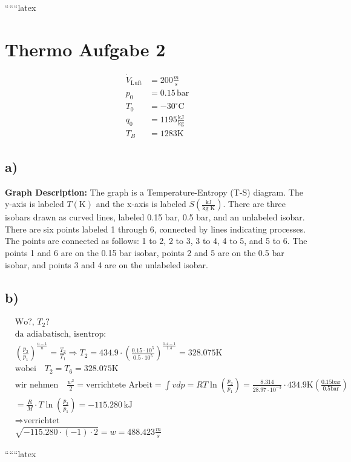 
``````latex


\section*{Thermo Aufgabe 2}

\begin{align*}
\dot{V}_{\text{Luft}} &= 200 \frac{m}{s} \\
p_0 &= 0.15 \, \text{bar} \\
T_0 &= -30^\circ \text{C} \\
q_0 &= 1195 \frac{\text{kJ}}{\text{kg}} \\
T_B &= 1283 \text{K}
\end{align*}

\subsection*{a)}

\textbf{Graph Description:} The graph is a Temperature-Entropy (T-S) diagram. The y-axis is labeled $T(\text{K})$ and the x-axis is labeled $S \left( \frac{\text{kJ}}{\text{kg K}} \right)$. There are three isobars drawn as curved lines, labeled 0.15 bar, 0.5 bar, and an unlabeled isobar. There are six points labeled 1 through 6, connected by lines indicating processes. The points are connected as follows: 1 to 2, 2 to 3, 3 to 4, 4 to 5, and 5 to 6. The points 1 and 6 are on the 0.15 bar isobar, points 2 and 5 are on the 0.5 bar isobar, and points 3 and 4 are on the unlabeled isobar.

\subsection*{b)}

\begin{align*}
&\text{Wo?}, \, T_2? \\
&\text{da adiabatisch, isentrop:} \\
&\left( \frac{p_2}{p_1} \right)^{\frac{n-1}{n}} = \frac{T_2}{T_1} \Rightarrow T_2 = 434.9 \cdot \left( \frac{0.15 \cdot 10^5}{0.5 \cdot 10^5} \right)^{\frac{1.4-1}{1.4}} = 328.075 \text{K} \\
&\text{wobei} \quad T_2 = T_6 = 328.075 \text{K} \\
&\text{wir nehmen} \quad \frac{w^2}{2} = \text{verrichtete Arbeit} = \int vdp = RT \ln \left( \frac{p_2}{p_1} \right) = \frac{8.314}{28.97 \cdot 10^{-3}} \cdot 434.9 \text{K} \left( \frac{0.15 \text{bar}}{0.5 \text{bar}} \right) \\
&= \frac{R}{M} \cdot T \ln \left( \frac{p_2}{p_1} \right) = -115.280 \, \text{kJ} \\
&\Rightarrow \text{verrichtet} \\
&\sqrt{-115.280 \cdot (-1) \cdot 2} = w = 488.423 \frac{m}{s}
\end{align*}

``````latex


